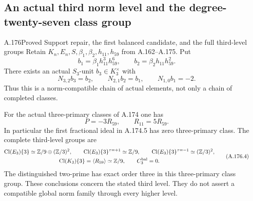 \subsection{An actual third norm level and the degree-twenty-seven class group}

\begin{statement}{A.176}{Proved}
{Support repair, the first balanced candidate, and the full third-level groups}
Retain \(K_n,E_n,S,\beta_1,\beta_2,h_{11},h_{59}\) from
A.162--A.175.  Put
\[
       b_1=\beta_1h_{11}^3h_{59}^6,\qquad
       b_2=\beta_2h_{11}h_{59}^2.
\tag{A.176.1}
\]
There exists an actual \(S_3\)-unit \(b_3\in K_3^\times\) with
\[
 N_{3,2}b_3=b_2,\qquad N_{2,1}b_2=b_1,\qquad
                         N_{1,0}b_1=-2.
\tag{A.176.2}
\]
Thus this is a norm-compatible chain of actual elements, not only
a chain of completed classes.

For the actual three-primary classes of A.174 one has
\[
       P=-3R_{59},\qquad R_{11}=5R_{59}.
\tag{A.176.3}
\]
In particular the first fractional ideal in A.174.5 has zero
three-primary class.  The complete third-level groups are
\[
 \begin{gathered}
 \operatorname{Cl}(E_3)\{3\}\simeq
                \mathbb Z/9\oplus(\mathbb Z/3)^2,\qquad
 \operatorname{Cl}(E_3)\{3\}^{\tau=+1}\simeq\mathbb Z/9,\qquad
 \operatorname{Cl}(E_3)\{3\}^{\tau=-1}\simeq(\mathbb Z/3)^2,\\
 \operatorname{Cl}(K_3)\{3\}=\langle R_{59}\rangle\simeq\mathbb Z/9,
                    \qquad C_3^{\rm bal}=0.
 \end{gathered}
\tag{A.176.4}
\]
The distinguished two-prime has exact order three in this
three-primary class group.  These conclusions concern the stated
third level.  They do not assert a compatible global norm family
through every higher level.
\end{statement}

